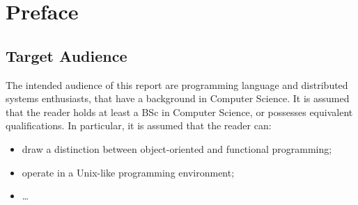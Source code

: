 \chapter*{Preface}



\section{Target Audience}

The intended audience of this report are programming language and
distributed systems enthusiasts, that have a background in Computer
Science. It is assumed that the reader holds at least a BSc in
Computer Science, or possesses equivalent qualifications. In
particular, it is assumed that the reader can:

\begin{itemize}

\item draw a distinction between object-oriented and functional
programming;

\item operate in a Unix-like programming environment;

\item \ldots

\end{itemize}
